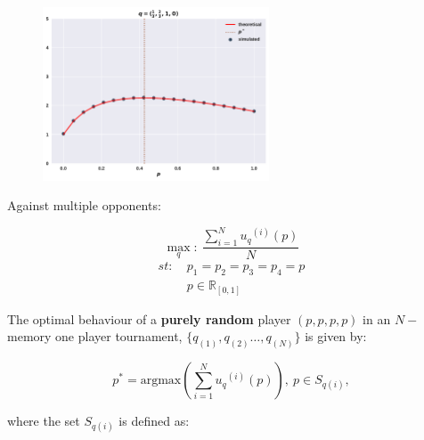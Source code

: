 \documentclass[usenames,dvipsnames,t]{beamer}
\newcommand{\R}{\mathbb{R}}
\begin{document}
\begin{columns}
\begin{column}{.45\linewidth}
        \begin{center}
            \begin{figure}
            \includegraphics[width=0.6\textwidth]{static/random_vs_one}
            \end{figure}
        \end{center}
        \vspace{0.5cm}

        \textcolor{solarizedGreen}{Against multiple opponents:}
        \vspace{0.5cm}

        \[\max_q: \ \frac{\sum_{i=1} ^ {N} {u_q}^{(i)} (p)}{N}\]
        \begin{equation*}
            \begin{aligned}
            st: & \ p_1 = p_2 = p_3 = p_4 = p\\
                & \ p \in \R_{[0, 1]} 
            \end{aligned}
            \end{equation*}
            \vspace{0.3cm}

            \small{
            The optimal behaviour of a \textbf{purely random} player \((p, p, p, p)\)
            in an \(N-\)memory one player tournament, \(\{q_{(1)}, q_{(2)} \dots,q_{(N)} \}
            \) is given by:}
            \vspace{0.3cm}

            \[p^* = \text{argmax}(\displaystyle \sum_{i=1} ^ {N} {u_q}^{(i)} (p)), \ p \in S_{q(i)},\]
            \vspace{0.3cm}
            
            \small{
            where the set \(S_{q(i)}\) is defined as:}
            \vspace{0.3cm}


\end{column}
\end{columns}
\end{document}
